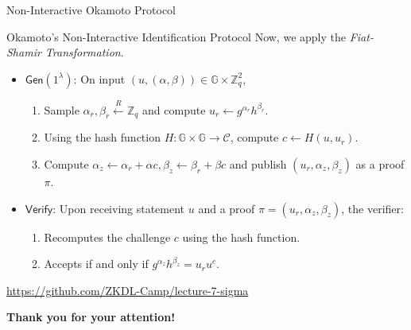 \documentclass{zkdl-presentation-template}
\begin{document}
    \begin{frame}{Non-Interactive Okamoto Protocol}
        \begin{block}{Okamoto's Non-Interactive Identification Protocol}
            Now, we apply the \textit{Fiat-Shamir Transformation}.
            \begin{itemize}
                \item $\mathsf{Gen}(1^{\lambda})$: On input $(u,(\alpha,\beta)) \in \mathbb{G} \times \mathbb{Z}_q^2$, 
                \begin{enumerate}
                    \item Sample $\alpha_r,\beta_r \xleftarrow{R} \mathbb{Z}_q$ and compute $u_r \gets g^{\alpha_r}h^{\beta_r}$.
                    \item Using the hash function $H: \mathbb{G} \times \mathbb{G} \to \mathcal{C}$, compute $c \gets H(u,u_r)$.
                    \item Compute $\alpha_z \gets \alpha_r + \alpha c, \beta_z \gets \beta_r + \beta c$ and publish $(u_r,\alpha_z,\beta_z)$ as a proof $\pi$.
                \end{enumerate}
                \item $\mathsf{Verify}$: Upon receiving statement $u$ and a proof $\pi=(u_r,\alpha_z,\beta_z)$, the verifier:
                \begin{enumerate}
                    \item Recomputes the challenge $c$ using the hash function.
                    \item Accepts if and only if $g^{\alpha_z}h^{\beta_z} = u_ru^c$.
                \end{enumerate}
            \end{itemize}
        \end{block}

        \begin{center}
            \textcolor{red!80!black}{\url{https://github.com/ZKDL-Camp/lecture-7-sigma}}
        \end{center}
    \end{frame}

	\begin{frame}{}
      \centering \Large
      \textbf{Thank you for your attention!}
    \end{frame}
\end{document}
